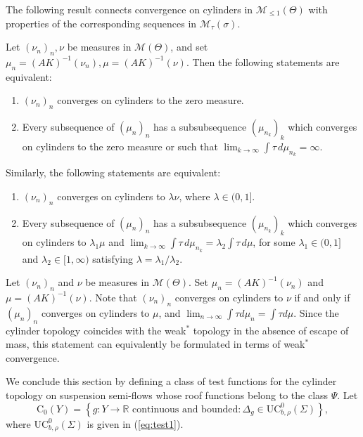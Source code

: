 \documentclass[letterpaper,11pt]{amsart}
\numberwithin{equation}{section}     %
\newcommand{\M}{\mathcal{M}}
\newcommand{\R}{\mathbb{R}}
\def\R{{\mathbb R}}
\def\M{{\mathcal M}}
\def\M{\mathcal{M}}
\begin{document}
The following result connects convergence on cylinders in $\M_{\leq 1}(\Theta)$ with properties of the corresponding sequences in $\M_\tau(\sigma)$.

\begin{lemma}[{\cite[Lemma 8.1.1]{v}}] \label{cyl_conver}
Let $(\nu_n)_n,\nu$ be measures in  $\M(\Theta)$, and set $\mu_n=(AK)^{-1}(\nu_n), \mu=(AK)^{-1}(\nu)$. Then the following statements are equivalent:
\begin{enumerate}
\item  $(\nu_n)_n$ converges on cylinders to the zero measure. 
\item Every subsequence of $(\mu_n)_n$ has a subsubsequence $(\mu_{n_k})_k$ which converges on cylinders to the zero measure or 
such that $\lim_{k\to\infty}\int \tau \, d\mu_{n_k}=\infty$.
\end{enumerate}
Similarly, the following statements are equivalent:
\begin{enumerate}
\item  $(\nu_n)_n$ converges on cylinders to $\lambda\nu$, where $\lambda\in (0,1]$. 
\item Every subsequence of $(\mu_n)_n$ has a subsubsequence $(\mu_{n_k})_k$ which converges on cylinders to $\lambda_1\mu$ and 
 $\lim_{k\to\infty}\int \tau \, d\mu_{n_k}=\lambda_2\int \tau \, d\mu$, for some $\lambda_1\in (0,1]$ and $\lambda_2\in [1,\infty)$ satisfying   $\lambda=\lambda_1/\lambda_2$.
\end{enumerate}
\end{lemma}

\begin{remark}\label{rem:convprob} Let $(\nu_n)_n$ and $\nu$ be measures in  $\M(\Theta)$. Set $\mu_n=(AK)^{-1}(\nu_n)$ and $\mu=(AK)^{-1}(\nu)$. Note that $(\nu_n)_n$ converges on cylinders to $\nu$ if and only if $(\mu_n)_n$ converges on cylinders to $\mu$, and $\lim_{n\to\infty}\int \tau d\mu_n=\int \tau d\mu$. Since the cylinder topology coincides with the weak$^\ast$ topology in the absence of escape of mass, this statement can equivalently be formulated in terms of weak$^\ast$ convergence.
\end{remark}

We conclude this section by defining a class of test functions for the cylinder topology on suspension semi-flows whose roof functions belong to the class $\Psi$. Let
\begin{equation}\label{eq:c0Y}
\text{C}_0(Y)= \left\{ g:Y \to\R \text{ continuous and bounded}: \Delta_g\in \text{UC}_{b,\rho}^0(\Sigma)	\right\},
\end{equation}
where $\text{UC}_{b,\rho}^0(\Sigma)$ is given in (\ref{eq:test1}). 
\end{document}
